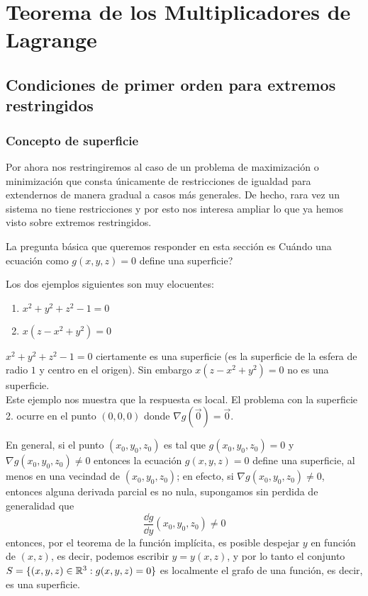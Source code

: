 \chapter{Teorema de los Multiplicadores de Lagrange}\label{sec-lagrange}

\section{Condiciones de primer orden para extremos restringidos}

\subsection{Concepto de superficie}

Por ahora nos restringiremos al caso de un problema de maximizaci\'on o minimizaci\'on que consta \'unicamente de restricciones de igualdad para extendernos de manera gradual a casos m\'as generales. De hecho, rara vez un sistema no tiene restricciones y por esto nos interesa ampliar lo que ya hemos visto sobre extremos restringidos.

La pregunta b\'asica que queremos responder en esta secci\'on es
{\textquestiondown}Cu\'ando una ecuaci\'on como $g(x,y,z)=0$ define una superficie?

Los dos ejemplos siguientes son muy elocuentes:
\begin{enumerate}
\item $x^2+y^2+z^2-1=0$
\item $x(z-x^2+y^2)=0$
\end{enumerate}
$x^2+y^2+z^2-1=0$ ciertamente es una superficie (es la superficie de la esfera de
radio $1$ y centro en el origen). Sin embargo $x(z-x^2+y^2)=0$ no es una
superficie.
\\Este ejemplo nos muestra que la respuesta es local. 
El problema con la superficie 2. ocurre en el punto
$(0,0,0)$ donde $\nabla g(\vec{0})=\vec{0}$.

\begin{definicion}
En general, si el
punto $(x_0,y_0,z_0)$ es tal que $g(x_0,y_0,z_0)=0$ y $\nabla
g(x_0,y_0,z_0)\neq 0$ entonces la ecuaci\'on $g(x,y,z)=0$ define
una superficie, al menos en una vecindad de $(x_0,y_0,z_0)$; en
efecto, si $\nabla g(x_0,y_0,z_0)\neq 0$, entonces alguna derivada
parcial es no nula, supongamos sin perdida de generalidad que
\[\frac{\dd g}{\dd y}(x_0,y_0,z_0)\neq 0\]
entonces, por el teorema de la funci\'on impl\'icita, es posible
despejar $y$ en funci\'on de $(x,z)$, es decir, podemos escribir
$y=y(x,z)$, y por lo tanto el conjunto $S=\{(x,y,z)\in \mathbb{R}^3 : g(x,y,z)=0\}$
es localmente el grafo de una funci\'on, es decir, es una
superficie.
\end{definicion}

